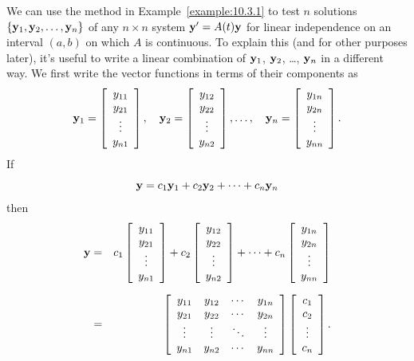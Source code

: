 We can use the method in Example~\ref{example:10.3.1} to test $n$ solutions
$\{{\bf y}_{1},{\bf y}_{2},\dots,{\bf y}_{n}\}$ of any $n\times n$ system ${\bf y}'=A(t){\bf y}$ for
linear independence on an interval $(a,b)$ on which $A$ is continuous. To explain this (and for
other purposes later), it's useful to write a linear combination of ${\bf y}_{1}$, ${\bf y}_{2}$,
\dots, ${\bf y}_{n}$ in a different way. We first write the vector functions in terms of their
components as
\[
  {\bf y}_{1}=\left[
  \begin{array}{c}
    y_{11} \\
    y_{21} \\
    \vdots \\
    y_{n1}
  \end{array}\right],\quad{\bf y}_{2}=\left[
  \begin{array}{c}
    y_{12} \\
    y_{22} \\
    \vdots \\
    y_{n2}
  \end{array}\right],\dots,\quad{\bf y}_{n}=\left[
  \begin{array}{c}
    y_{1n} \\
    y_{2n} \\
    \vdots \\
    y_{nn}
  \end{array}\right].
\]
If
\[
  {\bf y}=c_{1}{\bf y}_{1}+c_{2}{\bf y}_{2}+\cdots+c_{n}{\bf y}_{n}
\]
then
\enlargethispage{.3in}
\begin{eqnarray*}
  {\bf y}&=& c_{1}\left[
  \begin{array}{c}
    y_{11} \\
    y_{21} \\
    \vdots \\
    y_{n1}
  \end{array}\right]+ c_{2}\left[
  \begin{array}{c}
    y_{12} \\
    y_{22} \\
    \vdots \\
    y_{n2}
  \end{array}\right]+\cdots +c_{n}\left[
  \begin{array}{c}
    y_{1n} \\
    y_{2n} \\
    \vdots \\
    y_{nn}
  \end{array}\right]\\[2\jot] &=&\left[
  \begin{array}{cccc}
    y_{11} & y_{12} & \cdots & y_{1n} \\
    y_{21} & y_{22} & \cdots & y_{2n} \\
    \vdots & \vdots & \ddots & \vdots \\
    y_{n1} & y_{n2} & \cdots & y_{nn} \\
  \end{array}\right]\left[\begin{array}{c}c_1\\c_2\\\vdots\\c_n\end{array}\right].
\end{eqnarray*}
